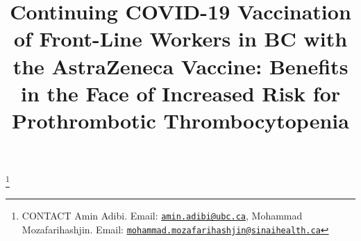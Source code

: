 \documentclass[]{interact}
\theoremstyle{plain}%
\theoremstyle{definition}
\theoremstyle{remark}
\begin{document}

\title{Continuing COVID-19 Vaccination of Front-Line Workers in BC with
the AstraZeneca Vaccine: Benefits in the Face of Increased Risk for
Prothrombotic Thrombocytopenia}


\author{
}

\thanks{CONTACT Amin
Adibi. Email: \href{mailto:amin.adibi@ubc.ca}{\nolinkurl{amin.adibi@ubc.ca}}, Mohammad
Mozafarihashjin. Email: \href{mailto:mohammad.mozafarihashjin@sinaihealth.ca}{\nolinkurl{mohammad.mozafarihashjin@sinaihealth.ca}}}

\maketitle
\end{document}

